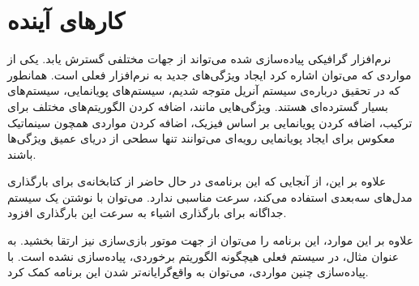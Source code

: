 \chapter {کار‌‌های آینده}

نرم‌افزار گرافیکی پیاده‌سازی شده می‌تواند از جهات مختلفی گسترش یابد.
 یکی از مواردی که می‌توان اشاره کرد 
ایجاد ویژگی‌های جدید به نرم‌افزار فعلی است. همانطور که در تحقیق درباره‌ی سیستم آنریل متوجه‌ شدیم، سیستم‌‌های پویانمایی،
سیستم‌‌های بسیار گسترده‌ای هستند. ویژگی‌هایی مانند، اضافه کردن الگوریتم‌های مختلف برای ترکیب،
اضافه کردن پویانمایی بر اساس فیزیک، اضافه کردن 
مواردی همچون سینماتیک معکوس برای ایجاد پویانمایی رویه‌ای می‌توانند تنها سطحی از دریای عمیق ویژگی‌ها باشند.

علاوه بر این، از آنجایی که این برنامه‌ی در حال حاضر از کتابخانه‌ی 
برای بارگذاری مدل‌های سه‌بعدی استفاده می‌کند، سرعت مناسبی ندارد.
می‌توان با نوشتن یک سیستم جداگانه برای بارگذاری اشیاء به سرعت این بارگذاری افزود.

علاوه بر این موارد، این برنامه را می‌توان از جهت موتور بازی‌سازی نیز ارتقا بخشید.
به عنوان مثال، در سیستم فعلی هیچگونه الگوریتم برخوردی، پیاده‌سازی نشده است. با پیاده‌سازی چنین مواردی،
می‌توان به واقع‌گرایانه‌تر شدن این برنامه کمک کرد.